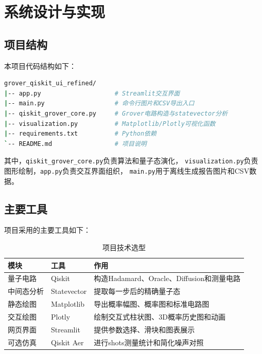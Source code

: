 \section{系统设计与实现}

\subsection{项目结构}

本项目代码结构如下：

\begin{lstlisting}[language=bash]
grover_qiskit_ui_refined/
|-- app.py                    # Streamlit交互界面
|-- main.py                   # 命令行图片和CSV导出入口
|-- qiskit_grover_core.py     # Grover电路构造与statevector分析
|-- visualization.py          # Matplotlib/Plotly可视化函数
|-- requirements.txt          # Python依赖
`-- README.md                 # 项目说明
\end{lstlisting}

其中，\texttt{qiskit\_grover\_core.py}负责算法和量子态演化，
\texttt{visualization.py}负责图形绘制，\texttt{app.py}负责交互界面组织，
\texttt{main.py}用于离线生成报告图片和CSV数据。

\subsection{主要工具}

项目采用的主要工具如下：

\begin{table}[!htbp]
  \centering
  \caption{项目技术选型}
  \begin{tabular}{lll}
    \toprule
    模块    & 工具          & 作用                               \\
    \midrule
    量子电路  & Qiskit      & 构造Hadamard、Oracle、Diffusion和测量电路 \\
    中间态分析 & Statevector & 提取每一步后的精确量子态                     \\
    静态绘图  & Matplotlib  & 导出概率幅图、概率图和标准电路图                 \\
    交互绘图  & Plotly      & 绘制交互式柱状图、3D概率历史图和动画              \\
    网页界面  & Streamlit   & 提供参数选择、滑块和图表展示                   \\
    可选仿真  & Qiskit Aer  & 进行shots测量统计和简化噪声对照               \\
    \bottomrule
  \end{tabular}
\end{table}

